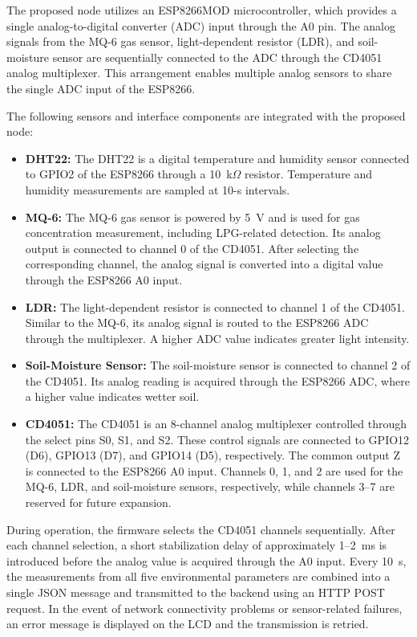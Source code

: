 ﻿\documentclass[journal]{IEEEtran}
\begin{document}
The proposed node utilizes an ESP8266MOD microcontroller, which provides a
single analog-to-digital converter (ADC) input through the A0 pin. The analog
signals from the MQ-6 gas sensor, light-dependent resistor (LDR), and
soil-moisture sensor are sequentially connected to the ADC through the CD4051
analog multiplexer. This arrangement enables multiple analog sensors to share
the single ADC input of the ESP8266.

The following sensors and interface components are integrated with the
proposed node:

\begin{itemize}
    \item \textbf{DHT22:} The DHT22 is a digital temperature and humidity
    sensor connected to GPIO2 of the ESP8266 through a 10~k$\Omega$ resistor.
    Temperature and humidity measurements are sampled at 10-s intervals.

    \item \textbf{MQ-6:} The MQ-6 gas sensor is powered by 5~V and is used
    for gas concentration measurement, including LPG-related detection.
    Its analog output is connected to channel 0 of the CD4051. After
    selecting the corresponding channel, the analog signal is converted
    into a digital value through the ESP8266 A0 input.

    \item \textbf{LDR:} The light-dependent resistor is connected to
    channel 1 of the CD4051. Similar to the MQ-6, its analog signal is
    routed to the ESP8266 ADC through the multiplexer. A higher ADC value
    indicates greater light intensity.

    \item \textbf{Soil-Moisture Sensor:} The soil-moisture sensor is
    connected to channel 2 of the CD4051. Its analog reading is acquired
    through the ESP8266 ADC, where a higher value indicates wetter soil.

    \item \textbf{CD4051:} The CD4051 is an 8-channel analog multiplexer
    controlled through the select pins S0, S1, and S2. These control signals
    are connected to GPIO12 (D6), GPIO13 (D7), and GPIO14 (D5),
    respectively. The common output Z is connected to the ESP8266 A0 input.
    Channels 0, 1, and 2 are used for the MQ-6, LDR, and soil-moisture
    sensors, respectively, while channels 3--7 are reserved for future
    expansion.
\end{itemize}

During operation, the firmware selects the CD4051 channels sequentially.
After each channel selection, a short stabilization delay of approximately
1--2~ms is introduced before the analog value is acquired through the A0
input. Every 10~s, the measurements from all five environmental parameters
are combined into a single JSON message and transmitted to the backend using
an HTTP POST request. In the event of network connectivity problems or
sensor-related failures, an error message is displayed on the LCD and the
transmission is retried.
\end{document}
